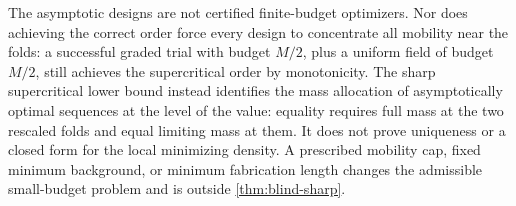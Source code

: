 The asymptotic designs are not certified finite-budget optimizers.
Nor does achieving the correct order force every design to concentrate
all mobility near the folds: a successful graded trial with budget
$M/2$, plus a uniform field of budget $M/2$, still achieves the
supercritical order by monotonicity. The sharp supercritical lower
bound instead identifies the mass allocation of asymptotically
optimal sequences at the level of the value: equality requires full
mass at the two rescaled folds and equal limiting mass at them.
It does not prove uniqueness or a closed form for the local minimizing
density. A prescribed mobility cap, fixed minimum background, or
minimum fabrication length changes the admissible small-budget
problem and is outside \cref{thm:blind-sharp}.
